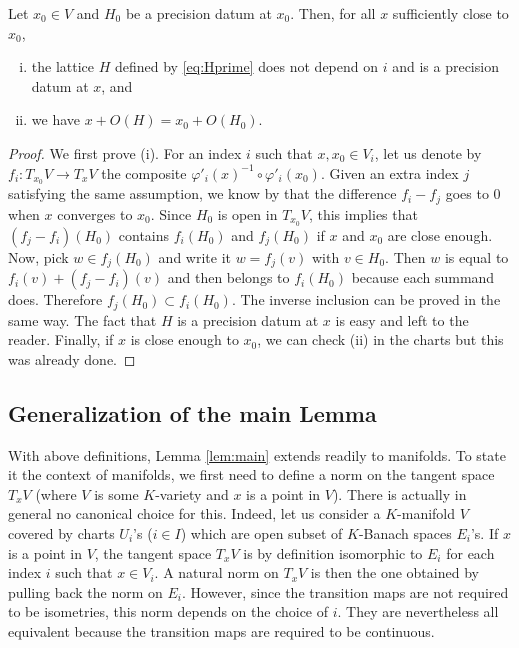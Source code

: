 \documentclass{lms}
\begin{document}
\begin{prop}
Let $x_0 \in V$ and $H_0$ be a precision datum at $x_0$.
Then, for all $x$ sufficiently close to $x_0$,
\begin{enumerate}[(i)]
\item the lattice $H$ defined by \eqref{eq:Hprime} does not depend 
on $i$ and is a precision datum at $x$, and
\item we have $x + O(H) = x_0 + O(H_0)$.
\end{enumerate}
\end{prop}

\begin{proof}
We first prove (i). For an index $i$ such that $x, x_0 \in V_i$, let us 
denote by $f_i : T_{x_0} V \to T_x V$ the composite $\varphi'_i(x)^{-1} 
\circ \varphi'_i(x_0)$. Given an extra index $j$ satisfying the same
assumption, we know by  that the difference
$f_i - f_j$ goes to $0$ when $x$ converges to $x_0$. Since $H_0$ is open
in $T_{x_0} V$, this implies that $(f_j - f_i)(H_0)$ contains $f_i(H_0)$ and 
$f_j(H_0)$ if $x$ and $x_0$ are close enough. Now, pick $w \in f_j(H_0)$ and 
write it $w = f_j(v)$ with $v \in H_0$. Then $w$ is equal to $f_i(v) + 
(f_j - f_i)(v)$ and then belongs to $f_i(H_0)$ because each summand does. 
Therefore $f_j(H_0) \subset f_i(H_0)$. The inverse inclusion can be proved 
in the same way. The fact that $H$ is a precision datum at $x$ is easy
and left to the reader.
Finally, if $x$ is close enough to $x_0$, we can check (ii) in the 
charts but this was already done.
\end{proof}

\subsection{Generalization of the main Lemma}

With above definitions, Lemma \ref{lem:main} extends readily to 
manifolds. To state it the context of manifolds, we first need to define 
a norm on the tangent space $T_x V$ (where $V$ is some $K$-variety and 
$x$ is a point in $V$). There is actually in general no canonical choice 
for this. Indeed, let us consider a $K$-manifold $V$ covered by charts 
$U_i$'s ($i \in I$) which are open subset of $K$-Banach spaces $E_i$'s. If $x$ 
is a point in $V$, the tangent space $T_x V$ is by definition isomorphic 
to $E_i$ for each index $i$ such that $x \in V_i$. A natural norm on 
$T_x V$ is then the one obtained by pulling back the norm on $E_i$. 
However, since the transition maps are not required to be isometries, 
this norm depends on the choice of $i$. They are nevertheless all
equivalent because the transition maps are required to be continuous.
\end{document}
